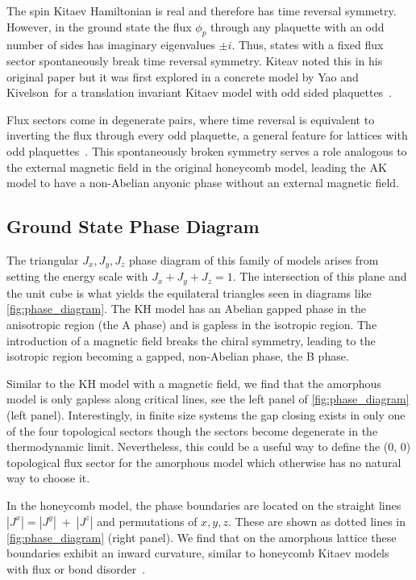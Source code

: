 The spin Kitaev Hamiltonian is real and therefore has time reversal symmetry. However, in the ground state the flux \(\phi_p\) through any plaquette with an odd number of sides has imaginary eigenvalues \(\pm i\). Thus, states with a fixed flux sector spontaneously break time reversal symmetry. Kiteav noted this in his original paper but it was first explored in a concrete model by Yao and Kivelson~for a translation invariant Kitaev model with odd sided plaquettes~\autocite{Yao2011}.

Flux sectors come in degenerate pairs, where time reversal is equivalent to inverting the flux through every odd plaquette, a general feature for lattices with odd plaquettes~\autocite{yaoExactChiralSpin2007,Peri2020}. This spontaneously broken symmetry serves a role analogous to the external magnetic field in the original honeycomb model, leading the AK model to have a non-Abelian anyonic phase without an external magnetic field.

\hypertarget{ground-state-phase-diagram}{%
\subsection{Ground State Phase Diagram}\label{ground-state-phase-diagram}}

The triangular \(J_x, J_y, J_z\) phase diagram of this family of models arises from setting the energy scale with \(J_x + J_y + J_z = 1\). The intersection of this plane and the unit cube is what yields the equilateral triangles seen in diagrams like \cref{fig:phase_diagram}. The KH model has an Abelian gapped phase in the anisotropic region (the A phase) and is gapless in the isotropic region. The introduction of a magnetic field breaks the chiral symmetry, leading to the isotropic region becoming a gapped, non-Abelian phase, the B phase.

Similar to the KH model with a magnetic field, we find that the amorphous model is only gapless along critical lines, see the left panel of \cref{fig:phase_diagram} (left panel). Interestingly, in finite size systems the gap closing exists in only one of the four topological sectors though the sectors become degenerate in the thermodynamic limit. Nevertheless, this could be a useful way to define the (0, 0) topological flux sector for the amorphous model which otherwise has no natural way to choose it.

In the honeycomb model, the phase boundaries are located on the straight lines \(|J^x| = |J^y| \;+ \;|J^z|\) and permutations of \(x,y,z\). These are shown as dotted lines in \cref{fig:phase_diagram} (right panel). We find that on the amorphous lattice these boundaries exhibit an inward curvature, similar to honeycomb Kitaev models with flux or bond disorder~\autocite{knolle_dynamics_2016,Nasu_Thermal_2015,lahtinenPerturbedVortexLattices2014,willansDisorderQuantumSpin2010,zschockePhysicalStatesFinitesize2015,kaoDisorderDisorderLocalization2021}.

